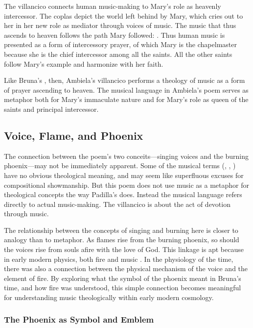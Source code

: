 The villancico connects human music-making to Mary's role as heavenly intercessor.
The coplas depict the world left behind by Mary, which cries out to her in her new role as mediator through voices of music.
The music that thus ascends to heaven follows the path Mary followed: .
Thus human music is presented as a form of intercessory prayer, of which Mary is the chapelmaster because she is the chief intercessor among all the saints.
All the other saints follow Mary's example and harmonize with her faith.

Like Bruna's , then, Ambiela's villancico performs a theology of music as a form of prayer ascending to heaven.
The musical language in Ambiela's poem serves as metaphor both for Mary's immaculate nature and for Mary's role as queen of the saints and principal intercessor.


\subsection{Voice, Flame, and Phoenix}

The connection between the poem's two conceits---singing voices and the burning phoenix---may not be immediately apparent.
Some of the musical terms (, , ) have no obvious theological meaning, and may seem like superfluous excuses for compositional showmanship.
But this poem does not use music as a metaphor for theological concepts the way Padilla's  does.
Instead the musical language refers directly to actual music-making.
The villancico is about the act of devotion through music.

The relationship between the concepts of singing and burning here is closer to analogy than to metaphor.
As flames rise from the burning phoenix, so should the voices rise from souls afire with the love of God.
This linkage is apt because in early modern physics, both fire and music .
In the physiology of the time, there was also a connection between the physical mechanism of the voice and the element of fire.
By exploring what the symbol of the phoenix meant in Bruna's time, and how fire was understood, this simple connection becomes meaningful for understanding music theologically within early modern cosmology.

\subsubsection{The Phoenix as Symbol and Emblem}

